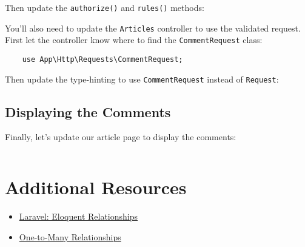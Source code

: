 Then update the \texttt{authorize()} and \texttt{rules()} methods:


You'll also need to update the \texttt{Articles} controller to use the validated request. First let the controller know where to find the \texttt{CommentRequest} class:

\begin{verbatim}
    use App\Http\Requests\CommentRequest;
\end{verbatim}

Then update the type-hinting to use \texttt{CommentRequest} instead of \texttt{Request}:



\subsection{Displaying the Comments}

Finally, let's update our article page to display the comments:

\inputminted{html}{10-one-to-many/figures/comments-list.blade.php}

\section{Additional Resources}

\begin{itemize}[leftmargin=*]
    \item \href{http://laravel.com/docs/7.x/eloquent-relationships}{Laravel: Eloquent Relationships}
    \item \href{https://mysql.programmingpedia.net/en/tutorial/9600/one-to-many}{One-to-Many Relationships}
\end{itemize}
